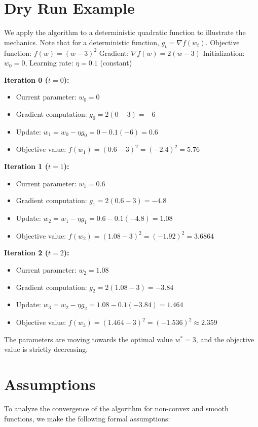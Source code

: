 \documentclass[11pt]{article}
\begin{document}
\section*{Dry Run Example}
We apply the algorithm to a deterministic quadratic function to illustrate the mechanics. Note that for a deterministic function, $g_t = \nabla f(w_t)$.
Objective function: $f(w) = (w-3)^2$
Gradient: $\nabla f(w) = 2(w-3)$
Initialization: $w_0 = 0$, Learning rate: $\eta = 0.1$ (constant)

\textbf{Iteration 0 ($t=0$):}
\begin{itemize}
    \item Current parameter: $w_0 = 0$
    \item Gradient computation: $g_0 = 2(0 - 3) = -6$
    \item Update: $w_1 = w_0 - \eta g_0 = 0 - 0.1(-6) = 0.6$
    \item Objective value: $f(w_1) = (0.6 - 3)^2 = (-2.4)^2 = 5.76$
\end{itemize}

\textbf{Iteration 1 ($t=1$):}
\begin{itemize}
    \item Current parameter: $w_1 = 0.6$
    \item Gradient computation: $g_1 = 2(0.6 - 3) = -4.8$
    \item Update: $w_2 = w_1 - \eta g_1 = 0.6 - 0.1(-4.8) = 1.08$
    \item Objective value: $f(w_2) = (1.08 - 3)^2 = (-1.92)^2 = 3.6864$
\end{itemize}

\textbf{Iteration 2 ($t=2$):}
\begin{itemize}
    \item Current parameter: $w_2 = 1.08$
    \item Gradient computation: $g_2 = 2(1.08 - 3) = -3.84$
    \item Update: $w_3 = w_2 - \eta g_2 = 1.08 - 0.1(-3.84) = 1.464$
    \item Objective value: $f(w_3) = (1.464 - 3)^2 = (-1.536)^2 \approx 2.359$
\end{itemize}
The parameters are moving towards the optimal value $w^* = 3$, and the objective value is strictly decreasing.

\section*{Assumptions}
To analyze the convergence of the algorithm for non-convex and smooth functions, we make the following formal assumptions:
\end{document}
